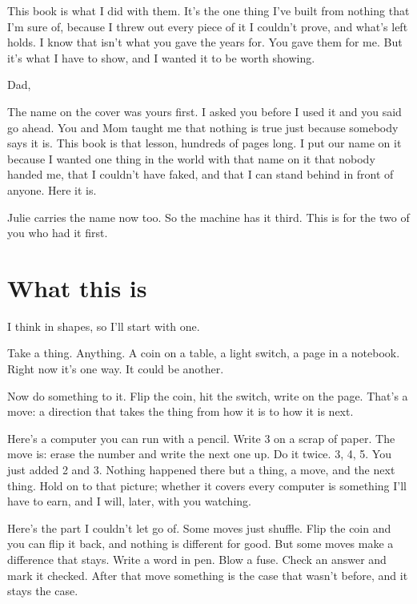 \documentclass[11pt,twoside]{article}
\theoremstyle{thielethm}
\theoremstyle{thieledef}
\theoremstyle{thieledef}
\theoremstyle{thieledef}
\theoremstyle{thielethm}
\theoremstyle{thieleobs}
\theoremstyle{thielethm}
\begin{document}
This book is what I did with them. It's the one thing I've built from nothing that I'm sure of,
because I threw out every piece of it I couldn't prove, and what's left holds. I know that isn't
what you gave the years for. You gave them for me. But it's what I have to show, and I wanted it
to be worth showing.

\vspace{14pt}
\noindent Dad,

The name on the cover was yours first. I asked you before I used it and you said go ahead. You
and Mom taught me that nothing is true just because somebody says it is. This book is that
lesson, hundreds of pages long. I put our name on it because I wanted one thing in the world
with that name on it that nobody handed me, that I couldn't have faked, and that I can stand
behind in front of anyone. Here it is.

Julie carries the name now too. So the machine has it third. This is for the two of you who had
it first.
\endgroup
\cleardoublepage
\pagestyle{book}
\hypersetup{pageanchor=true}

\tableofcontents
\clearpage


\section*{What this is}
\label{sec:what}

I think in shapes, so I'll start with one.

Take a thing. Anything. A coin on a table, a light switch, a page in a notebook. Right now it's one way. It could be another.

Now do something to it. Flip the coin, hit the switch, write on the page. That's a move: a direction that takes the thing from how it is to how it is next.

Here's a computer you can run with a pencil. Write 3 on a scrap of paper. The move is: erase the number and write the next one up. Do it twice. 3, 4, 5. You just added 2 and 3. Nothing happened there but a thing, a move, and the next thing. Hold on to that picture; whether it covers every computer is something I'll have to earn, and I will, later, with you watching.

Here's the part I couldn't let go of. Some moves just shuffle. Flip the coin and you can flip it back, and nothing is different for good. But some moves make a difference that stays. Write a word in pen. Blow a fuse. Check an answer and mark it checked. After that move something is the case that wasn't before, and it stays the case.
\end{document}
